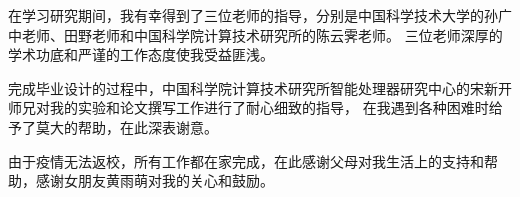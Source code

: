 
\begin{acknowledgements}

在学习研究期间，我有幸得到了三位老师的指导，分别是中国科学技术大学的孙广中老师、田野老师和中国科学院计算技术研究所的陈云霁老师。
三位老师深厚的学术功底和严谨的工作态度使我受益匪浅。

完成毕业设计的过程中，中国科学院计算技术研究所智能处理器研究中心的宋新开师兄对我的实验和论文撰写工作进行了耐心细致的指导，
在我遇到各种困难时给予了莫大的帮助，在此深表谢意。

由于疫情无法返校，所有工作都在家完成，在此感谢父母对我生活上的支持和帮助，感谢女朋友黄雨萌对我的关心和鼓励。

\end{acknowledgements}
